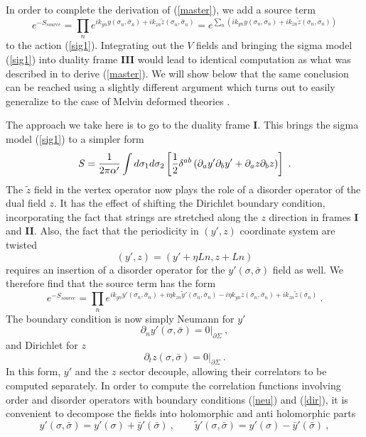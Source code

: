 \documentclass[12pt]{article}
\newcommand{\be}{\begin{equation}}
\newcommand{\ee}{\end{equation}}
\begin{document}
In order to complete the derivation of (\ref{master}), we add a source term
%
\be e^{- S_{source}} = \prod_n e^{i k_{yn} y(\sigma_n,\bar \sigma_n) + i k_{zn} \tilde z (\sigma_n,\bar\sigma_n)}  =
e^{\sum_n (i k_{yn} y(\sigma_n,\bar \sigma_n) + i k_{zn} \tilde z (\sigma_n,\bar \sigma_n))} \ee
%
to the action (\ref{sig1}).  Integrating out the $V$ fields and
bringing the sigma model (\ref{sig1}) into duality frame {\bf III}
would lead to identical computation as what was described in
\cite{Seiberg:1999vs} to derive (\ref{master}).  We will show below
that the same conclusion can be reached using a slightly different
argument which turns out to easily generalize to the case of Melvin
deformed theories \cite{Hashimoto:2004pb,Hashimoto:2005hy}.

The approach we take here is to go to the duality frame {\bf I}. This brings the sigma model (\ref{sig1}) to a simpler form
%
\be S= {1 \over 2 \pi \alpha'} \int d \sigma_1 d \sigma_2 \left[{1 \over 2} \delta^{ab} \left( \partial_a y' \partial_b y' +  \partial_a z \partial_b z\right)  \right]\label{sig4}\ . \ee
%
The $\tilde z$ field in the vertex operator now plays the role of a
disorder operator of the dual field $z$. It has the effect of shifting
the Dirichlet boundary condition, incorporating the fact that strings
are stretched along the $z$ direction in frames {\bf I} and {\bf
II}. Also, the fact that the periodicity in $(y',z)$ coordinate system
are twisted
%
\be (y',z) = (y'+\eta L n, z+L n) \ee
%
requires an insertion of a disorder operator for the
$y'(\sigma,\bar\sigma)$ field as well. We therefore find that the
source term has the form
%
\be e^{- S_{source}} = \prod_n e^{i k_{yn} y'(\sigma_n,\bar \sigma_n) + i \eta k_{zn} \tilde y'(\sigma_n, \bar \sigma_n)- i \eta k_{yn} z(\sigma_n,\bar \sigma_n) + i k_{zn} \tilde z (\sigma_n)}  \ . \ee
%
The boundary condition is now simply Neumann for $y'$ 
%
\be \left.\partial_n y'(\sigma, \bar \sigma) = 0\right|_{\partial \Sigma} \ , \label{neu} \ee
%
and Dirichlet for $z$ 
%
\be \left.\partial_t z(\sigma, \bar \sigma) = 0 \right|_{\partial \Sigma} \ . \label{dir} \ee
%
In this form, $y'$ and the $z$ sector decouple, allowing their
correlators to be computed separately. In order to compute the
correlation functions involving order and disorder operators with
boundary conditions (\ref{neu}) and (\ref{dir}), it is convenient to
decompose the fields into holomorphic and anti holomorphic parts
%
\be y'(\sigma, \bar \sigma) = y'(\sigma) + \bar y'(\bar \sigma)\ , \qquad
\tilde y'(\sigma, \bar \sigma) = y'(\sigma) - \bar y'(\bar \sigma)\ , \ee
\end{document}
